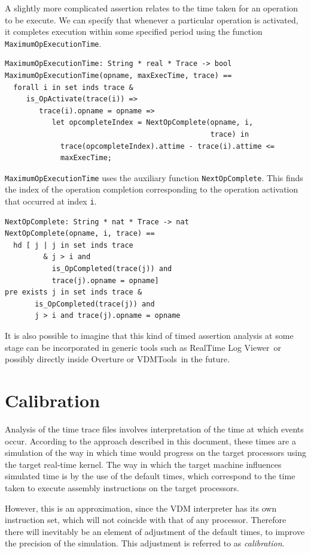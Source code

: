 \documentclass{overturerepchap}
\newcommand{\vdmtools}{VDMTools}
\newcommand{\showtrace}{RealTime Log Viewer}
\begin{document}
A slightly more complicated assertion relates to the time taken for an
operation to be execute. We can specify that whenever a particular
operation is activated, it completes execution within some specified
period using the function \texttt{MaximumOpExecutionTime}.

\begin{lstlisting}
MaximumOpExecutionTime: String * real * Trace -> bool
MaximumOpExecutionTime(opname, maxExecTime, trace) ==
  forall i in set inds trace &
     is_OpActivate(trace(i)) =>
        trace(i).opname = opname =>
           let opcompleteIndex = NextOpComplete(opname, i,
                                                trace) in
             trace(opcompleteIndex).attime - trace(i).attime <= 
             maxExecTime;
\end{lstlisting}

\texttt{MaximumOpExecutionTime} uses the auxiliary function
\texttt{NextOpComplete}. This finds the index of the operation
completion corresponding to the operation activation that occurred at
index \texttt{i}.

\begin{lstlisting}
NextOpComplete: String * nat * Trace -> nat
NextOpComplete(opname, i, trace) ==
  hd [ j | j in set inds trace
         & j > i and
           is_OpCompleted(trace(j)) and 
           trace(j).opname = opname]
pre exists j in set inds trace & 
       is_OpCompleted(trace(j)) and
       j > i and trace(j).opname = opname
\end{lstlisting}

It is also possible to imagine that this kind of timed assertion analysis 
at some stage can be incorporated in generic tools such as 
\showtrace\ or possibly directly inside Overture or \vdmtools\ in the future.

\section{Calibration}

Analysis of the time trace files involves interpretation of the time
at which events occur.  According to the approach described in this
document, these times are a simulation of the way in which time would
progress on the target processors using the target real-time kernel. The
way in which the target machine influences simulated time is by the use
of the default times, which correspond to the time taken to execute
assembly instructions on the target processors.

However, this is an approximation, since the VDM interpreter has its
own instruction set, which will not coincide with that of any
processor. Therefore there will inevitably be an element of adjustment
of the default times, to improve the precision of the simulation. This
adjustment is referred to as \emph{calibration}.
\end{document}
